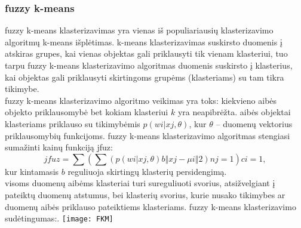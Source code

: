 \documentclass{VUMIFInfKursinis}
\begin{document}
		\subsubsection{fuzzy k-means}
			fuzzy k-means klasterizavimas yra vienas iš populiariausių klasterizavimo algoritmų k-means išplėtimas. k-means klasterizavimas suskirsto duomenis į atskiras grupes, kai vienas objektas gali priklausyti tik vienam klasteriui, tuo tarpu fuzzy k-means klasterizavimo algoritmas duomenis suskirsto į klasterius, kai objektas gali priklausyti skirtingoms grupėms (klasteriams) su tam tikra tikimybe.\\
			fuzzy k-means klasterizavimo algoritmo veikimas yra toks: kiekvieno aibės objekto priklausomybė bet kokiam klasteriui $k$ yra neapibrėžta. aibės objektai klasteriams priklauso su tikimybėmis $p(wi | xj, \theta)$, kur $\theta$ – duomenų vektorius priklausomybių funkcijoms. fuzzy k-means klasterizavimo algoritmas stengiasi sumažinti kainų funkciją jfuz:
			\begin{equation}
				jfuz=\sum{(\sum{(p(wi|xj,\theta)b‖xj−μi‖2)}nj=1)}ci = 1,
			\end{equation}
			kur kintamasis $b$ reguliuoja skirtingų klasterių persidengimą.\\
			visoms duomenų aibėms klasteriai turi sureguliuoti svorius, atsižvelgiant į pateiktų duomenų atstumus, bei klasterių svorius, kurie nusako tikimybes ar duomenų aibės priklauso pateiktiems klasteriams. fuzzy k-means klasterizavimo sudėtingumas:.
			\texttt{[image: FKM]}

\end{document}
